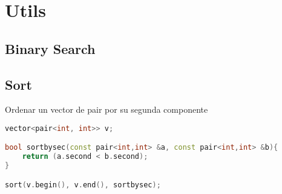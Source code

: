 \section{Utils}

\subsection{Binary Search}


\subsection{Sort}
Ordenar un vector de pair por su segunda componente
\begin{lstlisting}[language=C++]
vector<pair<int, int>> v;

bool sortbysec(const pair<int,int> &a, const pair<int,int> &b){
	return (a.second < b.second);
}

sort(v.begin(), v.end(), sortbysec);
\end{lstlisting}
\newpage

